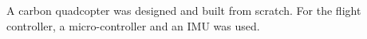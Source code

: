 A carbon quadcopter was designed and built from scratch. For the flight controller, a micro-controller and an IMU was used.



\begin{comment}
- Jan Dyre comments, backup:
- Parameter verification, PID in to VPQ
- Write about our experiences
- Good with 131 tests, nobody expects more
- Auto-level tests - Brutal flight controller
- Accerlerometer tests
- Variable Pitch no RPM compensation
- Spenning / vinkel på x-aksen på simuleringene (spesifikt for fixed pitch)
- Z-axis must be defined as up in VPQ
- More consistent with the word Test (to verifciation). Test -> Research in VPQ.
- Reality vs. project plan
- Forside på høyre side!
- Teknisk tabell feil på mek & mathematical model
- Masse antagelser, på variabel pitch quad, vekt-distrubisjon.
- 5 settninger i auto-level
- 2 settninger på presentasjon
\end{comment}